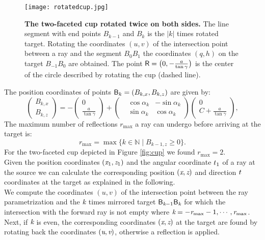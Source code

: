 \begin{figure}[t]%
 \begin{center}
  \texttt{[image: rotatedcup.jpg]}
  \end{center}
 \caption{\textbf{The two-faceted cup rotated twice on both sides.} The line segment with end points $B_{k-1}$ and $B_{k}$ is the $|k|$ times rotated target. Rotating the coordinates $(u,v)$ of the intersection point between a ray and the segment $B_0B_1$ the coordinates $(q,h)$ on the target $B_{-1}B_{0}$ are obtained. The point $\textsf{R} = \big(0,-\frac{a}{\tan{\gamma}}\big)$ is the center of the circle described by rotating the cup (dashed line).}
  \label{fig:twofaced}
  \end{figure}
The position coordinates of points $\textsf{B}_k = (B_{k,x}, B_{k,z})$ are given by:
\begin{equation}
 \begin{pmatrix} B_{k,x}  \\  B_{k,z}\end{pmatrix}= -
  \begin{pmatrix} 0  \\  \frac{a}{\tan\gamma}\end{pmatrix}+
 \left(\begin{split}  & \cos\alpha_k  & -\sin\alpha_k \\  & \sin\alpha_k & \cos\alpha_k\end{split}\right)
 \begin{pmatrix}  0 \\  C+\frac{a}{\tan\gamma}\end{pmatrix},
\end{equation}
The maximum number of reflections $r_{\textrm{max}}$ a ray can undergo before arriving at the target is:
\begin{equation}
r_{\textrm{max}}=\max\{k\in\mathbb{N} \;| \; B_{k-1,z}\geq 0\}.
\end{equation}
For the two-faceted cup depicted in Figure \ref{fig:cup} we found $r_{\textrm{max}}=2$.\\ \indent 
Given the position coordinates $(\textit{x}_1, \textit{z}_1)$ and the angular coordinate $t_1$ of a ray at the source we can calculate the corresponding position $(\textit{x}, \textit{z})$ and direction $t$ coordinates at the target as explained in the following. \\ \indent We compute the coordinates $(u,v)$ of the intersection point between the ray parametrization and the $\textit{k}$ times mirrored target $\textsf{B}_{\textit{k}-1}\textsf{B}_{\textit{k}}$ for which the intersection with the forward ray is not empty where $\textit{k}=-\textit{r}_{\textrm{max}}-1, \cdots, \textit{r}_{\textrm{max}}$. Next, if $\textit{k}$ is even, the corresponding coordinates $(\textit{x},\textit{z})$ at the target are found by rotating back the coordinates $(\textit{u},\textit{v})$, otherwise a reflection is applied.\\ \indent
